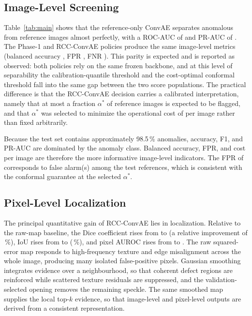 \documentclass[conference]{IEEEtran}
\begin{document}
\begin{table}[t]
\centering
\caption{Image- and pixel-level results on the test set}
\label{tab:main}

\end{table}

\subsection{Image-Level Screening}
Table~\ref{tab:main} shows that the reference-only ConvAE separates anomalous from reference images almost perfectly, with a ROC-AUC of \PoneAUC{} and PR-AUC of \PonePRAUC{}. The Phase-1 and RCC-ConvAE policies produce the same image-level metrics (balanced accuracy \PtwoBA{}, FPR \PtwoFPR{}, FNR \PtwoFNR{}). This parity is expected and is reported as observed: both policies rely on the same frozen backbone, and at this level of separability the calibration-quantile threshold and the cost-optimal conformal threshold fall into the same gap between the two score populations. The practical difference is that the RCC-ConvAE decision carries a calibrated interpretation, namely that at most a fraction $\alpha^*$ of reference images is expected to be flagged, and that $\alpha^*$ was selected to minimize the operational cost of \PtwoCost{} per image rather than fixed arbitrarily.

Because the test set contains approximately 98.5\,\% anomalies, accuracy, F1, and PR-AUC are dominated by the anomaly class. Balanced accuracy, FPR, and cost per image are therefore the more informative image-level indicators. The FPR of \PtwoFPR{} corresponds to \PtwoFP{} false alarm(s) among the \NTestRef{} test references, which is consistent with the conformal guarantee at the selected $\alpha^*$.

\subsection{Pixel-Level Localization}
The principal quantitative gain of RCC-ConvAE lies in localization. Relative to the raw-map baseline, the Dice coefficient rises from \PoneDice{} to \PtwoDice{} (a relative improvement of \DeltaDiceRel\,\%), IoU rises from \PoneIoU{} to \PtwoIoU{} (\DeltaIoURel\,\%), and pixel AUROC rises from \PonePixAUC{} to \PtwoPixAUC{}. The raw squared-error map responds to high-frequency texture and edge misalignment across the whole image, producing many isolated false-positive pixels. Gaussian smoothing integrates evidence over a neighbourhood, so that coherent defect regions are reinforced while scattered texture residuals are suppressed, and the validation-selected opening removes the remaining speckle. The same smoothed map supplies the local top-$k$ evidence, so that image-level and pixel-level outputs are derived from a consistent representation.
\end{document}
